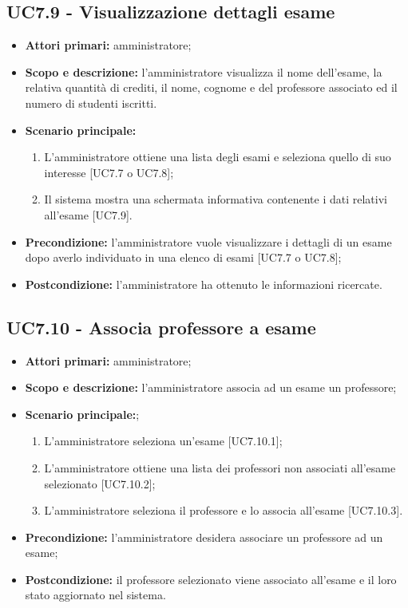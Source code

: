 \documentclass[AnalisiDeiRequisiti.tex]{subfiles}
\begin{document}
\subsection{UC7.9 - Visualizzazione dettagli esame}
\begin{itemize}
	\item \textbf{Attori primari:} amministratore;
	\item \textbf{Scopo e descrizione:} l'amministratore visualizza il nome dell'esame, la relativa quantità di crediti, il nome, cognome e  del professore associato ed il numero di studenti iscritti.
	\item \textbf{Scenario principale:}
	\begin{enumerate}
		\item L'amministratore ottiene una lista degli esami e seleziona quello di suo interesse [UC7.7 o UC7.8];
		\item Il sistema mostra una schermata informativa contenente i dati relativi all'esame [UC7.9].
	\end{enumerate}
	\item \textbf{Precondizione:} l'amministratore vuole visualizzare i dettagli di un esame dopo averlo individuato in una elenco di esami [UC7.7 o UC7.8]; 
	\item \textbf{Postcondizione:} l'amministratore ha ottenuto le informazioni ricercate.
\end{itemize}
\subsection{UC7.10 - Associa professore a esame}
\begin{itemize}
	\item \textbf{Attori primari:} amministratore;
	\item \textbf{Scopo e descrizione:} l'amministratore associa ad un esame un professore;
	\item \textbf{Scenario principale:};
	\begin{enumerate}
		\item L'amministratore seleziona un'esame [UC7.10.1];
		\item L'amministratore ottiene una lista dei professori non associati all'esame selezionato [UC7.10.2];
		\item L'amministratore seleziona il professore e lo associa all'esame [UC7.10.3].
	\end{enumerate}
	\item \textbf{Precondizione:} l'amministratore desidera associare un professore ad un esame; 
	\item \textbf{Postcondizione:} il professore selezionato viene associato all'esame e il loro stato aggiornato nel sistema.
\end{itemize}
\end{document}
